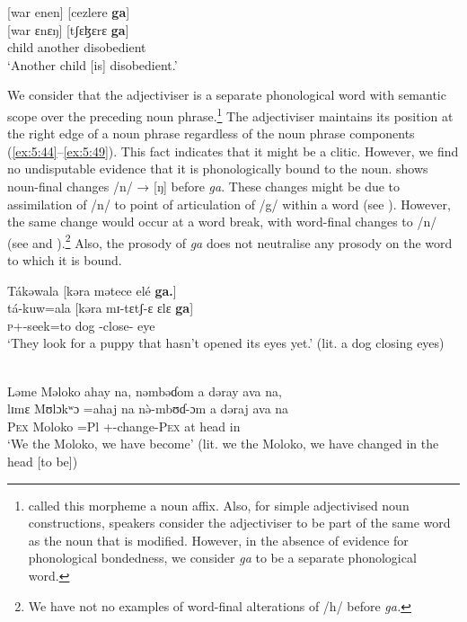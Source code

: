 \ea \label{ex:5:43}
{}[war  enen]  [cezlere  \textbf{ga}]\\
\gll  {}[war  ɛnɛŋ]   [tʃɛɮɛrɛ    \textbf{ga}]\\
      child    another    disobedient    {\ADJ}\\
\glt  ‘Another child [is] disobedient.’
\z

\largerpage
We consider that the adjectiviser is a separate phonological word with semantic scope over the preceding noun phrase.\footnote{\citet{Bow1997c} called this morpheme a noun affix. Also, for simple adjectivised noun constructions, speakers consider the adjectiviser to be part of the same word as the noun that is modified. However, in the absence of evidence for phonological bondedness, we consider \textit{ga} to be a separate phonological word.} The adjectiviser maintains its position at the right edge of a noun phrase regardless of the noun phrase components (\ref{ex:5:44}--\ref{ex:5:49}).  This fact indicates that it might be a clitic. However, we find no undisputable evidence that it is phonologically bound to the noun.  shows noun-final changes /n/ → [ŋ] before \textit{ga}. These changes might be due to assimilation of /n/ to point of articulation of /g/ within a word (see ). However, the same change would occur at a word break, with word-final changes to /n/ (see  and ).\footnote{We have not no examples of word-final alterations of /h/ before \textit{ga.}} Also, the prosody of \textit{ga} does not neutralise any prosody on the word to which it is bound. 

\ea \label{ex:5:44}
Tákəwala  [kəra  mətece  elé  \textbf{ga.}]\\
\gll  tá-kuw=ala    [kəra  mɪ-tɛtʃ-ɛ    ɛlɛ  \textbf{ga}]\\
      \textsc{p}+{\IFV}-seek=to  dog  {\NOM}{}-close-{\CL}  eye  {\ADJ}\\
\glt  ‘They look for a puppy that hasn’t opened its eyes yet.’ (lit. a dog closing eyes)
\z

\ea \label{ex:5:45}\\
Ləme  Məloko  ahay  na,  nəmbəɗom  a  dəray  ava  na,\\
\gll  lɪmɛ    Mʊlɔkʷɔ  =ahaj    na   n\`{ə}-mbʊɗ{}-ɔm        a  dəraj  ava  na \\
      \textsc{Pex}   Moloko      =Pl  {\PSP}  +{\PFV}-change-\textsc{Pex}  at   head  in    {\PSP}\\
\glt ‘We the Moloko, we have become’ (lit. we the Moloko, we have changed in the head [to be])
      
